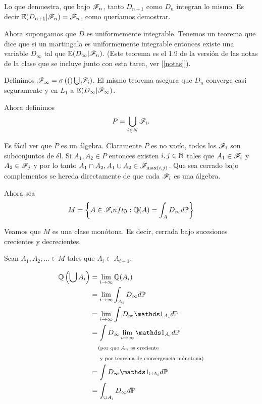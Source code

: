 \begin{itemize}
        Lo que demuestra, que bajo $\mathscr{F}_n$, tanto $D_{n+1}$ como $D_n$ integran lo mismo. Es decir
        $\mathbb{E}(D_{n+1} | \mathscr{F}_{n}) = \mathscr{F}_n$, como queríamos demostrar.\pn
\end{itemize}

Ahora supongamos que $D$ es uniformemente integrable. Tenemos un teorema que dice que si un martingala es 
uniformemente integrable entonces existe una variable $D_\infty$ tal que $\mathbb{E}(D_\infty | \mathscr{F}_n)$.
(Este teorema es el 1.9 de la versión de las notas de la clase que se incluye junto con esta tarea, 
ver [\ref{notas}]).\pn

Definimos $\mathscr{F}_\infty = \sigma\left( (\right) \bigcup \mathscr{F}_i)$. El mismo teorema asegura que $D_n$ converge casi seguramente y en
$L_1$ a $\mathbb{E}(D_\infty | \mathscr{F}_\infty)$. 

Ahora definimos
\begin{align}
    P   =   \bigcup_{i \in N} \mathscr{F}_i.
\end{align}\pn

Es fácil ver que $P$ es un álgebra. Claramente $P$ es no vacío, todos los $\mathscr{F}_i$ son subconjuntos de él. 
Si $A_1, A_2 \in P$ entonces existen $i, j \in \mathbb{N}$ tales que $A_1 \in \mathscr{F}_i$ y $A_2 \in \mathscr{F}_j$ y por lo 
tanto $A_1 \cap A_2, A_1 \cup A_2 \in \mathscr{F}_{\max(i,j)}$. Que sea cerrado bajo complementos se hereda directamente de
que cada $\mathscr{F}_i$ es una álgebra.\pn

Ahora sea 
\begin{align}
    M   =   \bigg\{ A \in \mathscr{F}_infty   :   \mathbb{Q}(A) = \int_A D_\infty d\mathbb{P} \bigg\}
\end{align}

Veamos que $M$ es una clase monótona. Es decir, cerrada bajo sucesiones crecientes y  decrecientes.\pn

Sean $A_1, A_2, \dots \in M$ tales que $A_i \subset A_{i+1}$.

\begin{align}
    \Q\paren{\bigcup A_i}   &=  \lim_{i \rightarrow \infty} \Q(A_i)                                         \\
                            &=  \lim_{i \rightarrow \infty} \int_{A_i}  D_\infty d\P                        \\
                            &=  \lim_{i \rightarrow \infty} \int  D_\infty \indic_{A_i} d\P                 \\
                            &=  \int  D_\infty \lim_{i \rightarrow \infty} \indic_{A_i} d\P                 \\
                            &\lcomment{por que $A_n$ es creciente}                                          \\
                            &\rcomment{ y por teorema de convergencia mónotona}                             \\
                            &=  \int  D_\infty \indic_{\cup A_i} d\P                                        \\
                            &=  \int_{\cup A_i}  D_\infty d\P                                               \\
\end{align}


